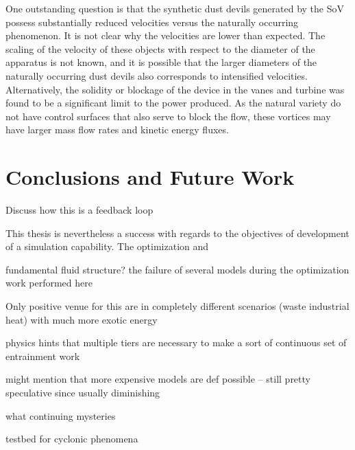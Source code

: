 
One outstanding question is that the synthetic dust devils generated by
the SoV possess substantially reduced velocities versus the naturally
occurring phenomenon. It is not clear why the velocities are lower than
expected. The scaling of the velocity of these objects with
respect to the diameter of the apparatus is not known, and it is
possible that the larger diameters of the naturally occurring dust
devils also corresponds to intensified velocities. Alternatively,
the solidity or blockage of the device in the vanes and turbine was
found to be a significant limit to the power produced. As the natural
variety do not have control surfaces that also serve to block the flow,
these vortices may have larger mass flow rates and kinetic energy
fluxes.  
 

\section{Conclusions and Future Work}

Discuss how this is a feedback loop

This thesis is nevertheless a success with regards to the objectives of
development of a simulation capability. The optimization and 


fundamental fluid structure? the failure of several models during the
optimization work performed here 


Only positive venue for this are in 
completely different scenarios (waste industrial heat)
with much more exotic energy

physics hints that multiple tiers are necessary to make a sort of
continuous set of entrainment work

might mention that more expensive models are def possible -- still pretty speculative since usually diminishing


what continuing mysteries



testbed for cyclonic phenomena


